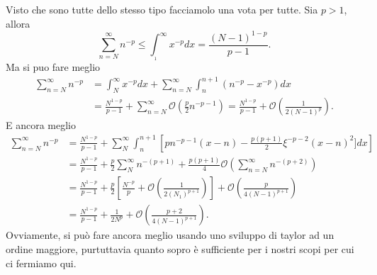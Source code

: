 \documentclass{report}
\newcommand\Or{{\mathcal O}}
\begin{document}
\begin{enumerate}
Visto che sono tutte dello stesso tipo facciamolo una vota per tutte.
Sia $p> 1$, allora
\[
\sum_{n=N}^\infty n^{-p}\leq \int_{_1}^\infty
x^{-p}dx=\frac{(N-1)^{1-p}}{p-1}.
\]
Ma si puo fare meglio
\begin{align*}
\sum_{n=N}^\infty n^{-p}&=\int_N^\infty
x^{-p}dx+\sum_{n=N}^\infty\int_n^{n+1}(n^{-p}-x^{-p}) dx\\
&=\frac{N^{1-p}}{p-1}+\sum_{n=N}^\infty{\mathcal O}(\frac p2 n^{-p-1})
=\frac{N^{1-p}}{p-1}+{\mathcal O}\left(\frac 1{2(N-1)^p}\right).
\end{align*}
E ancora meglio
\begin{align*}
\sum_{n=N}^\infty n^{-p}
&=\frac{N^{1-p}}{p-1}+\sum_{N}^\infty \int_n^{n+1}\left[
pn^{-p-1}(x-n)-\frac{p(p+1)}2 \xi^{-p-2}(x-n)^2] dx\right]\\
&=\frac{N^{1-p}}{p-1}+\frac p2\sum_{N}^\infty
n^{-(p+1)}+\frac{p(p+1)}4{\mathcal O}\left(\sum_{n=N}^\infty n^{-(p+2)}\right)\\
&=\frac{N^{1-p}}{p-1}+\frac p2\left[\frac{N^{-p}}p+\Or\left(\frac
1{2(N_1)^{p+1}}\right)\right] +\Or\left(\frac p{4(N-1)^{p+1}}\right)\\
&=\frac{N^{1-p}}{p-1}+\frac 1{2N^p}+\Or\left(\frac{p+2}{4(N-1)^{p+1}}\right).
\end{align*}
Ovviamente, si pu\`o fare ancora meglio usando uno sviluppo di taylor
ad un ordine maggiore, purtuttavia quanto sopro \`e sufficiente per i
nostri scopi per cui ci fermiamo qui.


\end{enumerate}
\end{document}

